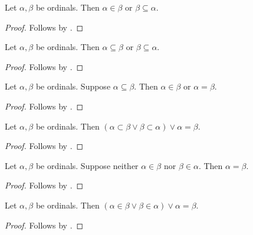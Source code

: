 \begin{proposition}\label{ordinal_elem_or_subseteq}
    Let $\alpha,\beta$ be ordinals.
    Then $\alpha\in\beta$ or $\beta\subseteq\alpha$.
\end{proposition}
\begin{proof}
    Follows by .
\end{proof}


\begin{proposition}\label{ordinal_subseteq_or_subseteq}
    Let $\alpha,\beta$ be ordinals.
    Then $\alpha\subseteq\beta$ or $\beta\subseteq\alpha$.
\end{proposition}
\begin{proof}
    Follows by .
\end{proof}


\begin{proposition}\label{ordinal_subseteq_implies_elem_or_eq}
    Let $\alpha,\beta$ be ordinals.
    Suppose $\alpha\subseteq\beta$.
    Then $\alpha\in\beta$ or $\alpha = \beta$.
\end{proposition}
\begin{proof}
    Follows by .
\end{proof}


\begin{corollary}\label{ordinal_subset_trichotomy}
    Let $\alpha,\beta$ be ordinals.
    Then $(\alpha\subset\beta \lor \beta\subset\alpha) \lor \alpha = \beta$.
\end{corollary}
\begin{proof}
    Follows by .
\end{proof}

\begin{proposition}\label{ordinal_nor_elem_implies_eq}
    Let $\alpha,\beta$ be ordinals.
    Suppose neither $\alpha\in\beta$ nor $\beta\in\alpha$.
    Then $\alpha = \beta$.
\end{proposition}
\begin{proof}
    Follows by .
\end{proof}

\begin{proposition}\label{ordinal_in_trichotomy}
    Let $\alpha,\beta$ be ordinals. Then $(\alpha\in\beta \lor \beta\in\alpha) \lor \alpha = \beta$.
\end{proposition}
\begin{proof}
    Follows by .
\end{proof}

